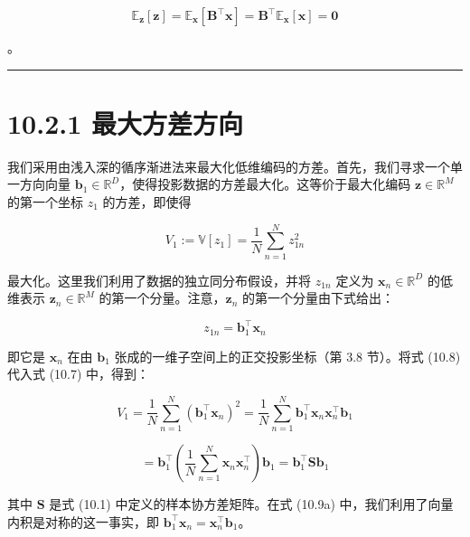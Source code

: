 \begin{equation*}
\mathbb{E}_{\boldsymbol{z}}[\boldsymbol{z}] = \mathbb{E}_{\boldsymbol{x}}[\boldsymbol{B}^\top\boldsymbol{x}] = \boldsymbol{B}^\top\mathbb{E}_{\boldsymbol{x}}[\boldsymbol{x}] = \boldsymbol{0}
\end{equation*}

。

\medskip\hrule\medskip

\section*{10.2.1 最大方差方向}

我们采用由浅入深的循序渐进法来最大化低维编码的方差。首先，我们寻求一个单一方向向量 $ \boldsymbol{b}_1 \in \mathbb{R}^D $，使得投影数据的方差最大化。这等价于最大化编码 $ \boldsymbol{z} \in \mathbb{R}^M $ 的第一个坐标 $ z_1 $ 的方差，即使得

\begin{equation}
V_1 := \mathbb{V}[z_1] = \frac{1}{N}\sum_{n=1}^N z_{1n}^2
\tag{10.7}
\end{equation}

最大化。这里我们利用了数据的独立同分布假设，并将 $ z_{1n} $ 定义为 $ \boldsymbol{x}_n \in \mathbb{R}^D $ 的低维表示 $ \boldsymbol{z}_n \in \mathbb{R}^M $ 的第一个分量。注意，$ \boldsymbol{z}_n $ 的第一个分量由下式给出：

\begin{equation}
z_{1n} = \boldsymbol{b}_1^\top \boldsymbol{x}_n
\tag{10.8}
\end{equation}

即它是 $ \boldsymbol{x}_n $ 在由 $ \boldsymbol{b}_1 $ 张成的一维子空间上的正交投影坐标（第 3.8 节）。将式 (10.8) 代入式 (10.7) 中，得到：

\begin{equation}
V_1 = \frac{1}{N}\sum_{n=1}^N \left(\boldsymbol{b}_1^\top \boldsymbol{x}_n\right)^2 = \frac{1}{N}\sum_{n=1}^N \boldsymbol{b}_1^\top \boldsymbol{x}_n \boldsymbol{x}_n^\top \boldsymbol{b}_1
\tag{10.9a}
\end{equation}

\begin{equation}
= \boldsymbol{b}_1^\top \left( \frac{1}{N}\sum_{n=1}^N \boldsymbol{x}_n \boldsymbol{x}_n^\top \right) \boldsymbol{b}_1 = \boldsymbol{b}_1^\top \boldsymbol{S}\boldsymbol{b}_1
\tag{10.9b}
\end{equation}

其中 $ \boldsymbol{S} $ 是式 (10.1) 中定义的样本协方差矩阵。在式 (10.9a) 中，我们利用了向量内积是对称的这一事实，即 $ \boldsymbol{b}_1^\top \boldsymbol{x}_n = \boldsymbol{x}_n^\top \boldsymbol{b}_1 $。


